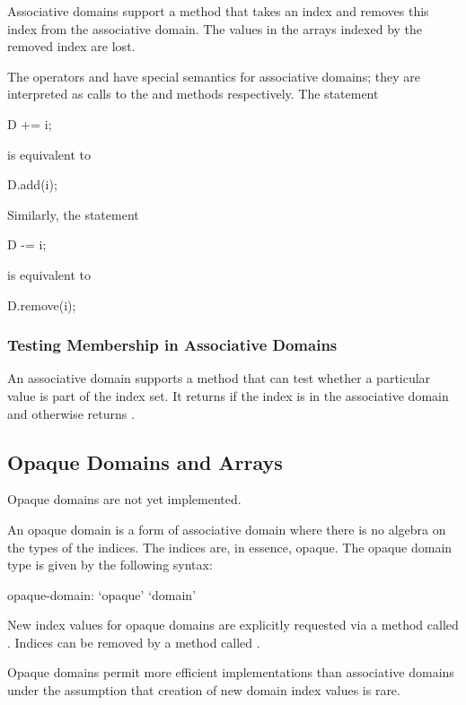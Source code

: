 Associative domains support a method  that takes an index
and removes this index from the associative domain.  The values in the
arrays indexed by the removed index are lost.

The operators \chpl{+=} and \chpl{-=} have special semantics for
associative domains; they are interpreted as calls to the 
and  methods respectively.  The statement
\begin{chapel}
D += i;
\end{chapel}
is equivalent to
\begin{chapel}
D.add(i);
\end{chapel}
Similarly, the statement
\begin{chapel}
D -= i;
\end{chapel}
is equivalent to
\begin{chapel}
D.remove(i);
\end{chapel}

\subsubsection{Testing Membership in Associative Domains}

An associative domain supports a  method that can test
whether a particular value is part of the index set. It
returns  if the index is in the associative domain and
otherwise returns .

\subsection{Opaque Domains and Arrays}
\label{Opaque_Domains_and_Arrays}

\begin{status}
Opaque domains are not yet implemented.
\end{status}

An opaque domain is a form of associative domain where there is no
algebra on the types of the indices.  The indices are, in essence,
opaque.  The opaque domain type is given by the following syntax:
\begin{syntax}
opaque-domain:
  `opaque' `domain'
\end{syntax}

New index values for opaque domains are explicitly requested via a
method called .  Indices can be removed by a method
called .

Opaque domains permit more efficient implementations than associative
domains under the assumption that creation of new domain index values
is rare.

